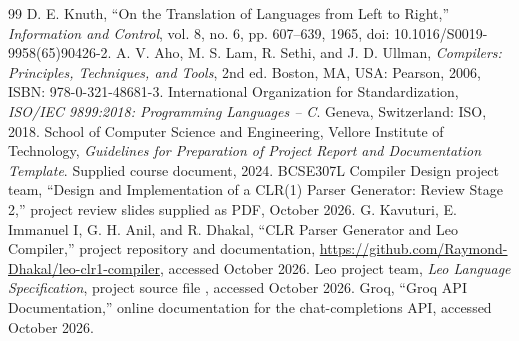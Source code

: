 \documentclass[12pt,a4paper,oneside]{report}
\newcommand{\code}[1]{\texttt{\detokenize{#1}}}
\begin{document}
\renewcommand{\bibname}{REFERENCES}
\begin{thebibliography}{99}
 D. E. Knuth, ``On the Translation of Languages from Left to Right,'' \emph{Information and Control}, vol. 8, no. 6, pp. 607--639, 1965, doi: 10.1016/S0019-9958(65)90426-2.
 A. V. Aho, M. S. Lam, R. Sethi, and J. D. Ullman, \emph{Compilers: Principles, Techniques, and Tools}, 2nd ed. Boston, MA, USA: Pearson, 2006, ISBN: 978-0-321-48681-3.
 International Organization for Standardization, \emph{ISO/IEC 9899:2018: Programming Languages -- C}. Geneva, Switzerland: ISO, 2018.
 School of Computer Science and Engineering, Vellore Institute of Technology, \emph{Guidelines for Preparation of Project Report and Documentation Template}. Supplied course document, 2024.
 BCSE307L Compiler Design project team, ``Design and Implementation of a CLR(1) Parser Generator: Review Stage 2,'' project review slides supplied as PDF, October 2026.
 G. Kavuturi, E. Immanuel I, G. H. Anil, and R. Dhakal, ``CLR Parser Generator and Leo Compiler,'' project repository and documentation, \url{https://github.com/Raymond-Dhakal/leo-clr1-compiler}, accessed October 2026.
 Leo project team, \emph{Leo Language Specification}, project source file \code{language/language\_spec.md}, accessed October 2026.
 Groq, ``Groq API Documentation,'' online documentation for the chat-completions API, accessed October 2026.
\end{thebibliography}
\end{document}
